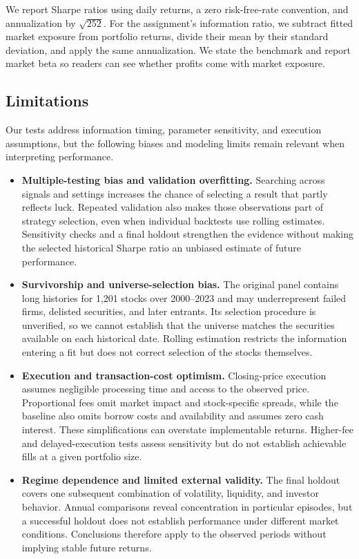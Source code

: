 We report Sharpe ratios using daily returns, a zero risk-free-rate
convention, and annualization by \(\sqrt{252}\). For the assignment's
information ratio, we subtract fitted market exposure from portfolio
returns, divide their mean by their standard deviation, and apply the
same annualization. We state the benchmark and report market beta so
readers can see whether profits come with market exposure.

\subsection{Limitations}

Our tests address information timing, parameter sensitivity, and execution
assumptions, but the following biases and modeling limits remain relevant
when interpreting performance.

\begin{itemize}
    \item \textbf{Multiple-testing bias and validation overfitting.}
    Searching across signals and settings increases the chance of selecting
    a result that partly reflects luck. Repeated validation also makes
    those observations part of strategy selection, even when individual
    backtests use rolling estimates. Sensitivity checks and a final holdout
    strengthen the evidence without making the selected historical Sharpe
    ratio an unbiased estimate of future performance.

    \item \textbf{Survivorship and universe-selection bias.} The original
    panel contains long histories for 1,201 stocks over 2000--2023 and may
    underrepresent failed firms, delisted securities, and later entrants.
    Its selection procedure is unverified, so we cannot establish that
    the universe matches the securities available on each historical date.
    Rolling estimation restricts the information entering a fit but does
    not correct selection of the stocks themselves.

    \item \textbf{Execution and transaction-cost optimism.} Closing-price
    execution assumes negligible processing time and access to the observed
    price. Proportional fees omit market impact and stock-specific spreads,
    while the baseline also omits borrow costs and availability and assumes
    zero cash interest. These simplifications can overstate implementable
    returns. Higher-fee and delayed-execution tests assess sensitivity but
    do not establish achievable fills at a given portfolio size.

    \item \textbf{Regime dependence and limited external validity.} The
    final holdout covers one subsequent combination of volatility, liquidity,
    and investor behavior. Annual comparisons reveal concentration in
    particular episodes, but a successful holdout does not establish
    performance under different market conditions. Conclusions therefore
    apply to the observed periods without implying stable future returns.
\end{itemize}
